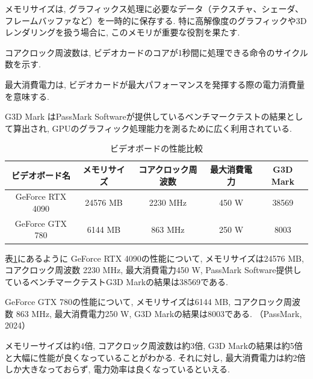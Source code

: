 \documentclass{ltjsarticle} %
\begin{document}
メモリサイズは, グラフィックス処理に必要なデータ（テクスチャ、シェーダ、フレームバッファなど）を一時的に保存する.
特に高解像度のグラフィックや3Dレンダリングを扱う場合に, このメモリが重要な役割を果たす.

コアクロック周波数は, ビデオカードのコアが1秒間に処理できる命令のサイクル数を示す.

最大消費電力は, ビデオカードが最大パフォーマンスを発揮する際の電力消費量を意味する.

G3D Mark はPassMark Softwareが提供しているベンチマークテストの結果として算出され, 
GPUのグラフィック処理能力を測るために広く利用されている.

\begin{table}[H] %
  \centering %
  \caption{ビデオボードの性能比較}
  \begin{tabular}{|c|c|c|c|c|} 
  \hline %
  ビデオボード名 & メモリサイズ & コアクロック周波数 & 最大消費電力 & G3D Mark\\ \hline %
  GeForce RTX 4090 & 24576 MB & 2230 MHz & 450 W & 38569 \\ \hline
  GeForce GTX 780 & 6144 MB & 863 MHz & 250 W & 8003 \\ \hline

  \end{tabular}
  \label{tab:gpu} %
\end{table}

表\ref{tab:gpu}にあるように
GeForce RTX 4090の性能について, メモリサイズは24576 MB, コアクロック周波数 2230 MHz, 最大消費電力450 W, 
PassMark Software提供しているベンチマークテストG3D Markの結果は38569である.

GeForce GTX 780の性能について, メモリサイズは6144 MB, コアクロック周波数 863 MHz, 最大消費電力250 W, 
G3D Markの結果は8003である. （PassMark, 2024）

メモリーサイズは約4倍, コアクロック周波数は約3倍, G3D Markの結果は約5倍と大幅に性能が良くなっていることがわかる.
それに対し, 最大消費電力は約2倍しか大きなっておらず, 電力効率は良くなっているといえる.
\end{document}
